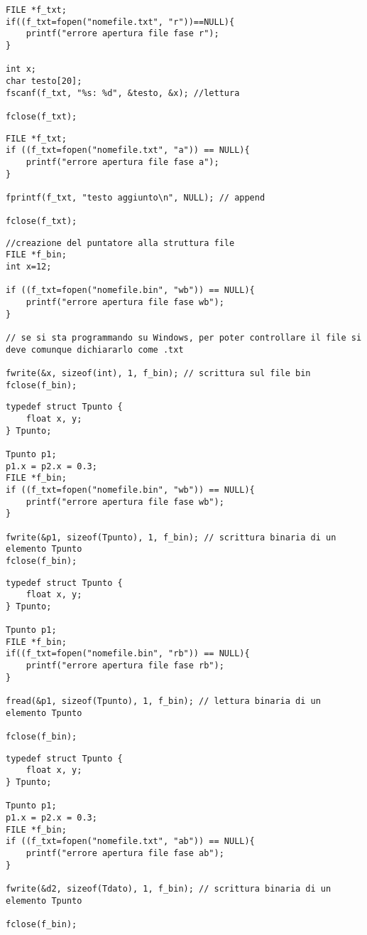 \begin{lstlisting}[title={Lettura da file di testo}]
FILE *f_txt;
if((f_txt=fopen("nomefile.txt", "r"))==NULL){
    printf("errore apertura file fase r");
}

int x;
char testo[20];
fscanf(f_txt, "%s: %d", &testo, &x); //lettura

fclose(f_txt);
\end{lstlisting}

\begin{lstlisting}[title={Append di un file di testo}]
FILE *f_txt;
if ((f_txt=fopen("nomefile.txt", "a")) == NULL){
    printf("errore apertura file fase a");
}

fprintf(f_txt, "testo aggiunto\n", NULL); // append

fclose(f_txt);
\end{lstlisting}

\begin{lstlisting}[title={File binari (.bin)}]
//creazione del puntatore alla struttura file
FILE *f_bin;
int x=12;

if ((f_txt=fopen("nomefile.bin", "wb")) == NULL){ 
    printf("errore apertura file fase wb");
}

// se si sta programmando su Windows, per poter controllare il file si deve comunque dichiararlo come .txt

fwrite(&x, sizeof(int), 1, f_bin); // scrittura sul file bin
fclose(f_bin);
\end{lstlisting}

\begin{lstlisting}[title={Scrittura di una struttura su file binario}]
typedef struct Tpunto {
    float x, y;
} Tpunto;

Tpunto p1;
p1.x = p2.x = 0.3;
FILE *f_bin;
if ((f_txt=fopen("nomefile.bin", "wb")) == NULL){ 
    printf("errore apertura file fase wb");
}

fwrite(&p1, sizeof(Tpunto), 1, f_bin); // scrittura binaria di un elemento Tpunto
fclose(f_bin);
\end{lstlisting}

\begin{lstlisting}[title={Lettura di una struttura da file binario}]
typedef struct Tpunto {
    float x, y;
} Tpunto;

Tpunto p1;
FILE *f_bin;
if((f_txt=fopen("nomefile.bin", "rb")) == NULL){
    printf("errore apertura file fase rb");
}

fread(&p1, sizeof(Tpunto), 1, f_bin); // lettura binaria di un elemento Tpunto

fclose(f_bin);
\end{lstlisting}

\begin{lstlisting}[title={Scrittura di una stuttura su file binario in append}]
typedef struct Tpunto {
    float x, y;
} Tpunto;

Tpunto p1;
p1.x = p2.x = 0.3;
FILE *f_bin;
if ((f_txt=fopen("nomefile.txt", "ab")) == NULL){
    printf("errore apertura file fase ab");
}

fwrite(&d2, sizeof(Tdato), 1, f_bin); // scrittura binaria di un elemento Tpunto

fclose(f_bin);
\end{lstlisting}
